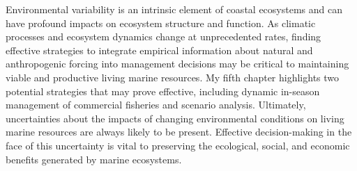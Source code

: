 Environmental variability is an intrinsic element of coastal ecosystems and can
have profound impacts on ecosystem structure and function. As climatic processes
and ecosystem dynamics change at unprecedented rates, finding effective
strategies to integrate empirical information about natural and anthropogenic
forcing into management decisions may be critical to maintaining viable and
productive living marine resources. My fifth chapter highlights two potential
strategies that may prove effective, including dynamic in-season management of
commercial fisheries and scenario analysis. Ultimately, uncertainties about the
impacts of changing environmental conditions on living marine resources are
always likely to be present. Effective decision-making in the face of this
uncertainty is vital to preserving the ecological, social, and economic benefits
generated by marine ecosystems.
